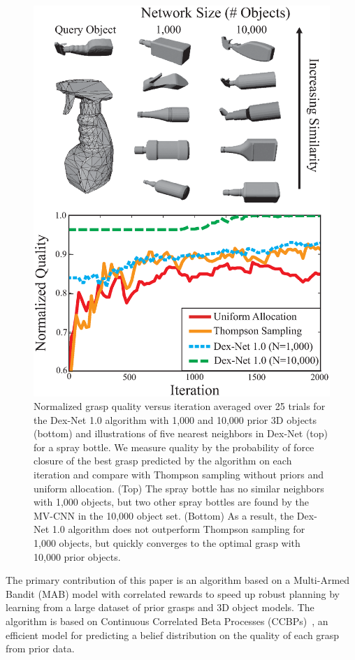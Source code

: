 \begin{figure}[t!]
\centering
\includegraphics[scale=0.45]{figures/illustrations/spray_bottle_avg_reward_w_neighbors.eps}
\caption{Normalized grasp quality versus iteration averaged over 25 trials for the Dex-Net 1.0 algorithm with 1,000 and 10,000 prior 3D objects (bottom) and illustrations of five nearest neighbors in Dex-Net (top) for a spray bottle. We measure quality by the probability of force closure of the best grasp predicted by the algorithm on each iteration and compare with Thompson sampling without priors and uniform allocation. (Top) The spray bottle has no similar neighbors with 1,000 objects, but two other spray bottles are found by the MV-CNN in the 10,000 object set. (Bottom) As a result, the Dex-Net 1.0 algorithm does not outperform Thompson sampling for 1,000 objects, but quickly converges to the optimal grasp with 10,000 prior objects.}
\vspace*{-20pt}
\end{figure}
The primary contribution of this paper is an algorithm based on a Multi-Armed Bandit (MAB) model with correlated rewards to speed up robust planning by learning from a large dataset of prior grasps and 3D object models.
The algorithm is based on Continuous Correlated Beta Processes (CCBPs)~\cite{goetschalckx2011continuous, montesano2012active}, an efficient model for predicting a belief distribution on the quality of each grasp from prior data.

